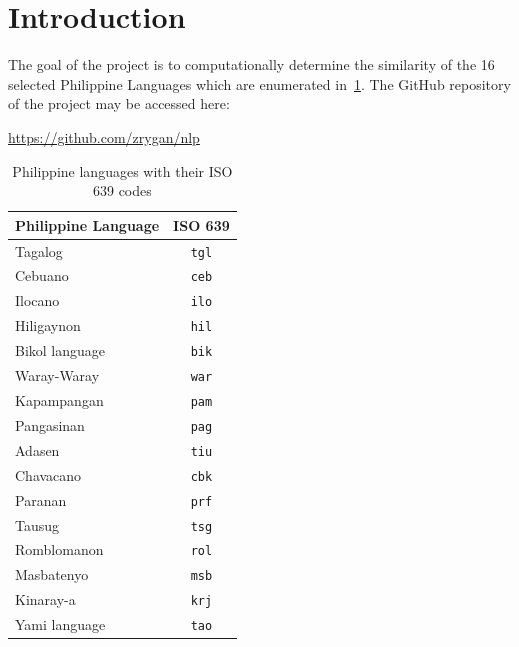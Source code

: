 \section{Introduction}\label{sec:intro}

The goal of the project is to computationally determine the similarity of the
16 selected Philippine Languages which are enumerated
in~\cref{tab:ph_languages}. The GitHub repository of the project may be
accessed here:
\begin{center}
    \url{https://github.com/zrygan/nlp}
\end{center}

\begin{table}[h!]
    \centering
    \begin{tabular}{lc}
        \hline
        \textbf{Philippine Language} & \textbf{ISO 639} \\
        \hline
        Tagalog                      & \texttt{tgl}     \\
        Cebuano                      & \texttt{ceb}     \\
        Ilocano                      & \texttt{ilo}     \\
        Hiligaynon                   & \texttt{hil}     \\
        Bikol language~\footnotemark & \texttt{bik}     \\
        Waray-Waray                  & \texttt{war}     \\
        Kapampangan                  & \texttt{pam}     \\
        Pangasinan                   & \texttt{pag}     \\
        Adasen                       & \texttt{tiu}     \\
        Chavacano                    & \texttt{cbk}     \\
        Paranan                      & \texttt{prf}     \\
        Tausug                       & \texttt{tsg}     \\
        Romblomanon                  & \texttt{rol}     \\
        Masbatenyo                   & \texttt{msb}     \\
        Kinaray-a                    & \texttt{krj}     \\
        Yami language                & \texttt{tao}     \\
        \hline
    \end{tabular}
    \caption{Philippine languages with their ISO 639 codes}\label{tab:ph_languages}
\end{table}

